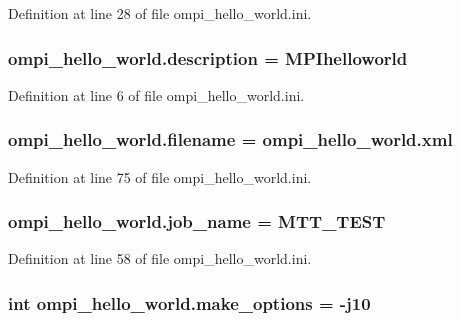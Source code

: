Definition at line 28 of file ompi\-\_\-hello\-\_\-world.\-ini.

\hypertarget{namespaceompi__hello__world_a52b9c10821e333fe5c7413d414abeb1b}{
\subsubsection[{description}]{\setlength{\rightskip}{0pt plus 5cm}ompi\-\_\-hello\-\_\-world.\-description = M\-P\-Ihelloworld}}\label{namespaceompi__hello__world_a52b9c10821e333fe5c7413d414abeb1b}


Definition at line 6 of file ompi\-\_\-hello\-\_\-world.\-ini.

\hypertarget{namespaceompi__hello__world_ae42ce8011012447dba87c7337e9ddab8}{
\subsubsection[{filename}]{\setlength{\rightskip}{0pt plus 5cm}ompi\-\_\-hello\-\_\-world.\-filename = ompi\-\_\-hello\-\_\-world.\-xml}}\label{namespaceompi__hello__world_ae42ce8011012447dba87c7337e9ddab8}


Definition at line 75 of file ompi\-\_\-hello\-\_\-world.\-ini.

\hypertarget{namespaceompi__hello__world_a6aa613720eb4f4129d00b6469b68d7cf}{
\subsubsection[{job\-\_\-name}]{\setlength{\rightskip}{0pt plus 5cm}ompi\-\_\-hello\-\_\-world.\-job\-\_\-name = M\-T\-T\-\_\-\-T\-E\-S\-T}}\label{namespaceompi__hello__world_a6aa613720eb4f4129d00b6469b68d7cf}


Definition at line 58 of file ompi\-\_\-hello\-\_\-world.\-ini.

\hypertarget{namespaceompi__hello__world_a3b1603e3acde68a17311cb93a6a5ef12}{
\subsubsection[{make\-\_\-options}]{\setlength{\rightskip}{0pt plus 5cm}int ompi\-\_\-hello\-\_\-world.\-make\-\_\-options = -\/j10}}\label{namespaceompi__hello__world_a3b1603e3acde68a17311cb93a6a5ef12}


